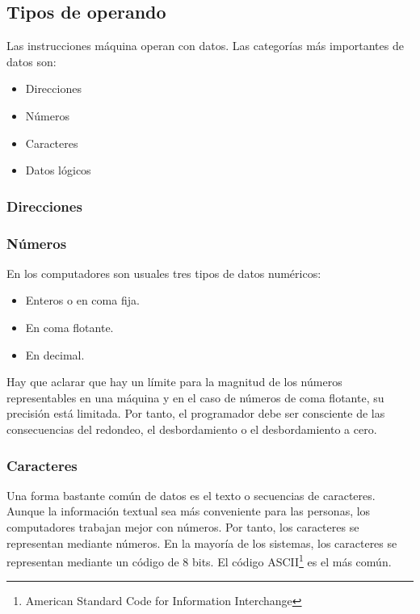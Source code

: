 \subsection{Tipos de operando}

Las instrucciones máquina operan con datos. Las categorías más importantes de datos son:

\begin{itemize}
  \item Direcciones
  \item Números 
  \item Caracteres
  \item Datos lógicos
\end{itemize}

\begin{subs}
  \subsubsection{Direcciones}

  \subsubsection{Números}

  En los computadores son usuales tres tipos de datos numéricos:

  \begin{itemize}
    \item Enteros o en coma fija.
    \item En coma flotante.
    \item En decimal.
  \end{itemize}

  Hay que aclarar que hay un límite para la magnitud de los números representables en una máquina y en el caso de números de coma flotante, su precisión está limitada. Por tanto, el programador debe ser consciente de las consecuencias del redondeo, el desbordamiento o el desbordamiento a cero.

  \subsubsection{Caracteres}

  Una forma bastante común de datos es el texto o secuencias de caracteres. Aunque la información textual sea más conveniente para las personas, los computadores trabajan mejor con números. Por tanto, los caracteres se representan mediante números. En la mayoría de los sistemas, los caracteres se representan mediante un código de 8 bits. El código ASCII\footnote{American Standard Code for Information Interchange} es el más común.


\end{subs}
